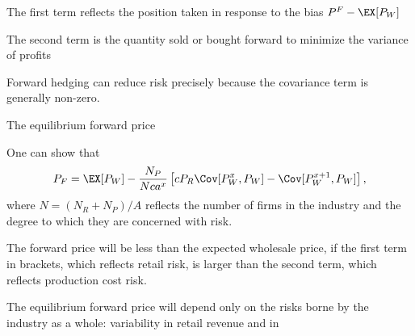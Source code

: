 	The first term reflects the position taken in response to the bias $P^F-\EX[P_W]$

	The second term is the quantity sold or bought forward to minimize the variance of profits


	Forward hedging can reduce risk precisely because the covariance term is generally non-zero.


{The equilibrium forward price}


	One can show that
$$
P_F=\EX[P_W]-\frac{N_P}{Nca^x}\left[cP_R\Cov[P_W^{x}, P_W]-\Cov[P_W^{x+1}, P_W]\right],
$$
where $N=(N_R+N_P)/A$ reflects the number of firms in the industry and the degree to which they are concerned with risk.

	The forward price will be less than the expected wholesale price, if the first term in brackets, which reflects retail risk, is
larger than the second term, which reflects production cost risk.

	The equilibrium forward price will depend only on the risks borne by the industry as a whole: variability in retail revenue and in %



